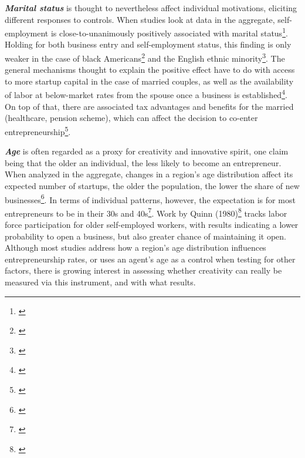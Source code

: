 \textbf{\textit{Marital status}} is thought to nevertheless affect individual motivations, eliciting different responses to controls. When studies look at data in the aggregate, self-employment is close-to-unanimously positively associated with marital status\footnote{\cite[Page~74]{Parker2004}}. Holding for both business entry and self-employment status, this finding is only weaker in the case of black Americans\footnote{\cite{borjas1986self}} and the English ethnic minority\footnote{\cite{clark2000pushed}}. The general mechanisms thought to explain the positive effect have to do with access to more startup capital in the case of married couples, as well as the availability of labor at below-market rates from the spouse once a business is established\footnote{\cite[Page~75]{Parker2004}}. On top of that, there are associated tax advantages and benefits for the married (healthcare, pension scheme), which can affect the decision to co-enter entrepreneurship\footnote{\cite[Page~75]{BlanchflowerOswald1998}}.

\textbf{\textit{Age}} is often regarded as a proxy for creativity and innovative spirit, one claim being that the older an individual, the less likely to become an entrepreneur. When analyzed in the aggregate, changes in a region's age distribution affect its expected number of startups, the older the population, the lower the share of new businesses\footnote{\cite{Bonte2007}}. In terms of individual patterns, however, the expectation is for most entrepreneurs to be in their 30s and 40s\footnote{\cite{LiangWangLazear2014}}. Work by Quinn (1980)\footnote{\cite{Quinn1980}} tracks labor force participation for older self-employed workers, with results indicating a lower probability to open a business, but also greater chance of maintaining it open. Although most studies address how a region's age distribution influences entrepreneurship rates, or uses an agent's age as a control when testing for other factors, there is growing interest in assessing whether creativity can really be measured via this instrument, and with what results.

